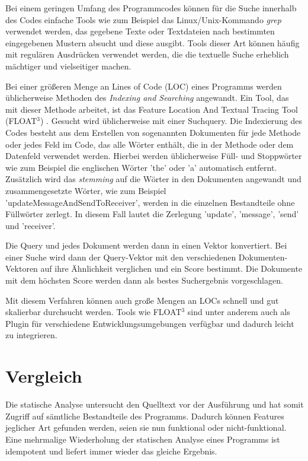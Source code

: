 \documentclass[runningheads,a4paper]{llncs}
\begin{document}
Bei einem geringen Umfang des Programmcodes können für die Suche innerhalb des Codes einfache Tools wie zum Beispiel das Linux/Unix-Kommando \textit{grep} verwendet werden, das gegebene Texte oder Textdateien nach bestimmten eingegebenen Mustern absucht und diese ausgibt. Tools dieser Art können häufig mit regulären Ausdrücken verwendet werden, die die textuelle Suche erheblich mächtiger und vielseitiger machen.

Bei einer größeren Menge an Lines of Code (LOC) eines Programms werden üblicherweise Methoden des \textit{Indexing and Searching} angewandt. Ein Tool, das mit dieser Methode arbeitet, ist das Feature Location And Textual Tracing Tool (FLOAT$^3$) \cite{textual}. Gesucht wird üblicherweise mit einer Suchquery. Die Indexierung des Codes besteht aus dem Erstellen von sogenannten Dokumenten für jede Methode oder jedes Feld im Code, das alle Wörter enthält, die in der Methode oder dem Datenfeld verwendet werden. Hierbei werden üblicherweise Füll- und Stoppwörter wie zum Beispiel die englischen Wörter 'the' oder 'a' automatisch entfernt.
 Zusätzlich wird das \textit{stemming} auf die Wörter in den Dokumenten angewandt und zusammengesetzte Wörter, wie zum Beispiel\\ \mbox{'updateMessageAndSendToReceiver'}, werden in die einzelnen Bestandteile ohne Füllwörter zerlegt. In diesem Fall lautet die Zerlegung 'update', 'message', 'send' und 'receiver'.
 
Die Query und jedes Dokument werden dann in einen Vektor konvertiert. Bei einer Suche wird dann der Query-Vektor mit den verschiedenen Dokumenten-Vektoren auf ihre Ähnlichkeit verglichen und ein Score bestimmt. Die Dokumente mit dem höchsten Score werden dann als bestes Suchergebnis vorgeschlagen.
 
Mit diesem Verfahren können auch große Mengen an LOCs schnell und gut skalierbar durchsucht werden. Tools wie FLOAT$^3$ sind unter anderem auch als Plugin für verschiedene Entwicklungsumgebungen verfügbar und dadurch leicht zu integrieren.

\section{Vergleich}

Die statische Analyse untersucht den Quelltext vor der Ausführung und hat somit Zugriff auf sämtliche Bestandteile des Programms. Dadurch können Features jeglicher Art gefunden werden, seien sie nun funktional oder nicht-funktional. Eine mehrmalige Wiederholung der statischen Analyse eines
Programms ist idempotent und liefert immer wieder das gleiche Ergebnis.
\end{document}
